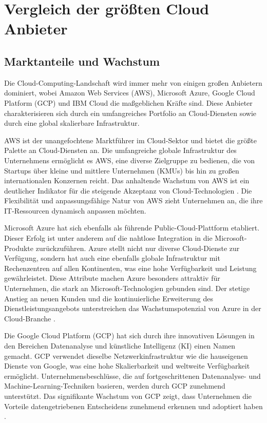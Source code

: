 \section{Vergleich der größten Cloud Anbieter}

\subsection{Marktanteile und Wachstum}

Die Cloud-Computing-Landschaft wird immer mehr von einigen großen Anbietern dominiert, wobei Amazon Web Services (AWS), Microsoft Azure, Google Cloud Platform (GCP) und IBM Cloud die maßgeblichen Kräfte sind. Diese Anbieter charakterisieren sich durch ein umfangreiches Portfolio an Cloud-Diensten sowie durch eine global skalierbare Infrastruktur.

AWS ist der unangefochtene Marktführer im Cloud-Sektor und bietet die größte Palette an Cloud-Diensten an. Die umfangreiche globale Infrastruktur des Unternehmens ermöglicht es AWS, eine diverse Zielgruppe zu bedienen, die von Startups über kleine und mittlere Unternehmen (KMUs) bis hin zu großen internationalen Konzernen reicht. Das anhaltende Wachstum von AWS ist ein deutlicher Indikator für die steigende Akzeptanz von Cloud-Technologien \cite{[1]}. Die Flexibilität und anpassungsfähige Natur von AWS zieht Unternehmen an, die ihre IT-Ressourcen dynamisch anpassen möchten.

Microsoft Azure hat sich ebenfalls als führende Public-Cloud-Plattform etabliert. Dieser Erfolg ist unter anderem auf die nahtlose Integration in die Microsoft-Produkte zurückzuführen. Azure stellt nicht nur diverse Cloud-Dienste zur Verfügung, sondern hat auch eine ebenfalls globale Infrastruktur mit Rechenzentren auf allen Kontinenten, was eine hohe Verfügbarkeit und Leistung gewährleistet. Diese Attribute machen Azure besonders attraktiv für Unternehmen, die stark an Microsoft-Technologien gebunden sind. Der stetige Anstieg an neuen Kunden und die kontinuierliche Erweiterung des Dienstleistungsangebots unterstreichen das Wachstumspotenzial von Azure in der Cloud-Branche \cite{[2]}.

Die Google Cloud Platform (GCP) hat sich durch ihre innovativen Lösungen in den Bereichen Datenanalyse und künstliche Intelligenz (KI) einen Namen gemacht. GCP verwendet dieselbe Netzwerkinfrastruktur wie die hauseigenen Dienste von Google, was eine hohe Skalierbarkeit und weltweite Verfügbarkeit ermöglicht. Unternehmensbeschlüsse, die auf fortgeschrittenen Datenanalyse- und Machine-Learning-Techniken basieren, werden durch GCP zunehmend unterstützt. Das signifikante Wachstum von GCP zeigt, dass Unternehmen die Vorteile datengetriebenen Entscheidens zunehmend erkennen und adoptiert haben \cite{[3]}.

